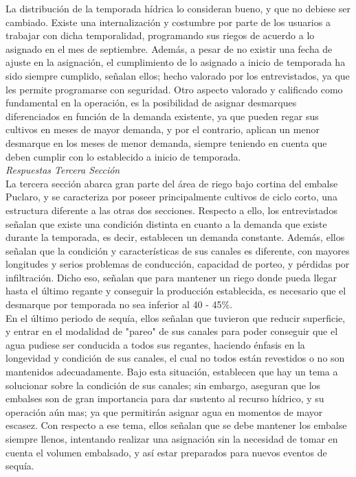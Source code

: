 \documentclass[11pt,]{article}
\begin{document}
La distribución de la temporada hídrica lo consideran bueno, y que no debiese ser cambiado. Existe una internalización y costumbre por parte de los usuarios a trabajar con dicha temporalidad, programando sus riegos de acuerdo a lo asignado en el mes de septiembre. Además, a pesar de no existir una fecha de ajuste en la asignación, el cumplimiento de lo asignado a inicio de temporada ha sido siempre cumplido, señalan ellos; hecho valorado por los entrevistados, ya que les permite programarse con seguridad. Otro aspecto valorado y calificado como fundamental en la operación, es la posibilidad de asignar desmarques diferenciados en función de la demanda existente, ya que pueden regar sus cultivos en meses de mayor demanda, y por el contrario, aplican un menor desmarque en los meses de menor demanda, siempre teniendo en cuenta que deben cumplir con lo establecido a inicio de temporada.\\
 
\textit {Respuestas Tercera Sección}\\

 La tercera sección abarca gran parte del área de riego bajo cortina del embalse Puclaro, y se caracteriza por poseer principalmente cultivos de ciclo corto, una estructura diferente a las otras dos secciones. Respecto a ello, los entrevistados señalan que existe una condición distinta en cuanto a la demanda que existe durante la temporada, es decir, establecen un demanda constante. Además, ellos señalan que la condición y características de sus canales es diferente, con mayores longitudes y serios problemas de conducción, capacidad de porteo, y pérdidas por infiltración. Dicho eso, señalan que para mantener un riego donde pueda llegar hasta el último regante y conseguir la producción establecida, es necesario que el desmarque por temporada no sea inferior al 40 - 45\%. \\
 
 En el último periodo de sequía, ellos señalan que tuvieron que reducir superficie, y entrar en el modalidad de "pareo" de sus canales para poder conseguir que el agua pudiese ser conducida a todos sus regantes, haciendo énfasis en la longevidad y condición de sus canales, el cual no todos están revestidos o no son mantenidos adecuadamente. Bajo esta situación, establecen que hay un tema a solucionar sobre la condición de sus canales; sin embargo, aseguran que los embalses son de gran importancia para dar sustento al recurso hídrico, y su operación aún mas; ya que permitirán asignar agua en momentos de mayor escasez. Con respecto a ese tema, ellos señalan que se debe mantener los embalse siempre llenos, intentando realizar una asignación sin la necesidad de tomar en cuenta el volumen embalsado, y así estar preparados para nuevos eventos de sequía. \\
  
\end{document}
